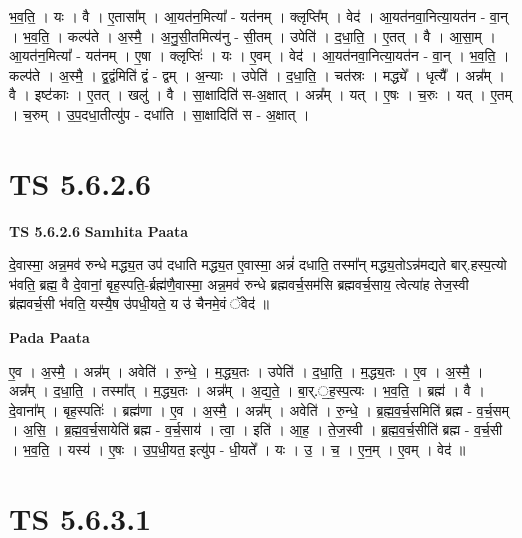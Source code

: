 \documentclass[17pt]{extarticle}
\begin{document}
भ॒व॒ति॒ । यः । वै । ए॒तासा᳚म् । आ॒यत॑न॒मित्या᳚ - यत॑नम् । क्लृप्ति᳚म् । वेद॑ । आ॒यत॑नवा॒नित्या॒यत॑न - वा॒न् । भ॒व॒ति॒ । कल्प॑ते । अ॒स्मै॒ । अ॒नु॒सी॒तमित्य॑नु - सी॒तम् । उपेति॑ । द॒धा॒ति॒ । ए॒तत् । वै । आ॒सा॒म् । आ॒यत॑न॒मित्या᳚ - यत॑नम् । ए॒षा । क्लृप्तिः॑ । यः । ए॒वम् । वेद॑ । आ॒यत॑नवा॒नित्या॒यत॑न - वा॒न् । भ॒व॒ति॒ । कल्प॑ते । अ॒स्मै॒ । द्व॒द्वंमिति॑ द्वं - द्वम् । अ॒न्याः । उपेति॑ । द॒धा॒ति॒ । चत॑स्रः । मद्ध्ये᳚ । धृत्यै᳚ । अन्न᳚म् । वै । इष्ट॑काः । ए॒तत् । खलु॑ । वै । सा॒क्षादिति॑ स-अ॒क्षात् । अन्न᳚म् । यत् । ए॒षः । च॒रुः । यत् । ए॒तम् । च॒रुम् । उ॒प॒दधा॒तीत्यु॑प - दधा॑ति । सा॒क्षादिति॑ स - अ॒क्षात् ।  \newline





\section{ TS 5.6.2.6 }

\textbf{TS 5.6.2.6 } \newline
\textbf{Samhita Paata} \newline

दे॒वास्मा॒ अन्न॒मव॑ रुन्धे मद्ध्य॒त उप॑ दधाति मद्ध्य॒त ए॒वास्मा॒ अन्नं॑ दधाति॒ तस्मा᳚न् मद्ध्य॒तोऽन्न॑मद्यते बार्.हस्प॒त्यो भ॑वति॒ ब्रह्म॒ वै दे॒वानां॒ बृह॒स्पति॒-र्ब्रह्म॑णै॒वास्मा॒ अन्न॒मव॑ रुन्धे ब्रह्मवर्च॒सम॑सि ब्रह्मवर्च॒साय॒ त्वेत्या॑ह तेज॒स्वी ब्र॑ह्मवर्च॒सी भ॑वति॒ यस्यै॒ष उ॑पधी॒यते॒ य उ॑ चैनमे॒वं ॅवेद॑ ॥ \newline

\textbf{Pada Paata} \newline

ए॒व । अ॒स्मै॒ । अन्न᳚म् । अवेति॑ । रु॒न्धे॒ । म॒द्ध्य॒तः । उपेति॑ । द॒धा॒ति॒ । म॒द्ध्य॒तः । ए॒व । अ॒स्मै॒ । अन्न᳚म् । द॒धा॒ति॒ । तस्मा᳚त् । म॒द्ध्य॒तः । अन्न᳚म् । अ॒द्य॒ते॒ । बा॒र्.॒ह॒स्प॒त्यः । भ॒व॒ति॒ । ब्रह्म॑ । वै । दे॒वाना᳚म् । बृह॒स्पतिः॑ । ब्रह्म॑णा । ए॒व । अ॒स्मै॒ । अन्न᳚म् । अवेति॑ ।       रु॒न्धे॒ । ब्र॒ह्म॒व॒र्च॒समिति॑ ब्रह्म - व॒र्च॒सम् । अ॒सि॒ । ब्र॒ह्म॒व॒र्च॒सायेति॑ ब्रह्म - व॒र्च॒साय॑ । त्वा॒ । इति॑ । आ॒ह॒ । ते॒ज॒स्वी । ब्र॒ह्म॒व॒र्च॒सीति॑ ब्रह्म - व॒र्च॒सी । भ॒व॒ति॒ । यस्य॑ । ए॒षः । उ॒प॒धी॒यत॒ इत्यु॑प - धी॒यते᳚ । यः । उ॒ । च॒ । ए॒न॒म् । ए॒वम् । वेद॑ ॥  \newline





\section{ TS 5.6.3.1 }
\end{document}
